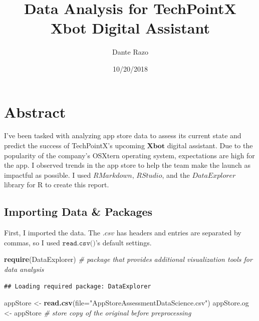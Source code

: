 \documentclass[]{article}
\title{Data Analysis for TechPointX Xbot Digital Assistant}
\author{Dante Razo}
\date{10/20/2018}
\newenvironment{Shaded}{\begin{snugshade}}{\end{snugshade}}
\newcommand{\CommentTok}[1]{\textcolor[rgb]{0.56,0.35,0.01}{\textit{#1}}}
\newcommand{\DataTypeTok}[1]{\textcolor[rgb]{0.13,0.29,0.53}{#1}}
\newcommand{\KeywordTok}[1]{\textcolor[rgb]{0.13,0.29,0.53}{\textbf{#1}}}
\newcommand{\NormalTok}[1]{#1}
\newcommand{\StringTok}[1]{\textcolor[rgb]{0.31,0.60,0.02}{#1}}
\begin{document}
\maketitle

\hypertarget{abstract}{%
\section{Abstract}\label{abstract}}

I've been tasked with analyzing app store data to assess its current
state and predict the success of TechPointX's upcoming \(\textbf{Xbot}\)
digital assistant. Due to the popularity of the company's OSXtern
operating system, expectations are high for the app. I observed trends
in the app store to help the team make the launch as impactful as
possible. I used \(\textit{RMarkdown}\), \(\textit{RStudio}\), and the
\(\textit{DataExplorer}\) library for R to create this report.

\hypertarget{importing-data-packages}{%
\subsection{Importing Data \& Packages}\label{importing-data-packages}}

First, I imported the data. The \(\textit{.csv}\) has headers and
entries are separated by commas, so I used \(\texttt{read.csv()}\)'s
default settings.

\begin{Shaded}
\begin{Highlighting}[]
\KeywordTok{require}\NormalTok{(DataExplorer)   }\CommentTok{# package that provides additional visualization tools for data analysis}
\end{Highlighting}
\end{Shaded}

\begin{verbatim}
## Loading required package: DataExplorer
\end{verbatim}

\begin{Shaded}
\begin{Highlighting}[]
\NormalTok{appStore <-}\StringTok{ }\KeywordTok{read.csv}\NormalTok{(}\DataTypeTok{file=}\StringTok{"AppStoreAssessmentDataScience.csv"}\NormalTok{)}
\NormalTok{appStore.og <-}\StringTok{ }\NormalTok{appStore }\CommentTok{# store copy of the original before preprocessing}
\end{Highlighting}
\end{Shaded}
\end{document}
